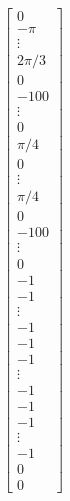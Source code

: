 \documentclass[11pt,usenames]{article}
\begin{document}
\begin{align}
\begin{bmatrix}
	0 \\ -\pi \\ \vdots \\  2\pi /3 \\ 
	0 \\ -100 \\ \vdots \\  0 \\ 
	\pi /4 \\ 0 \\ \vdots \\  \pi /4 \\ 
	0 \\ -100 \\ \vdots \\  0 \\ 
	-1 \\ -1 \\ \vdots \\  -1 \\ 
	-1 \\ -1 \\ \vdots \\  -1 \\ 
	-1 \\ -1 \\ \vdots \\  -1 \\  
	0 \\ 
	0  
	\end{bmatrix}
	\end{align}
	
\end{document}
